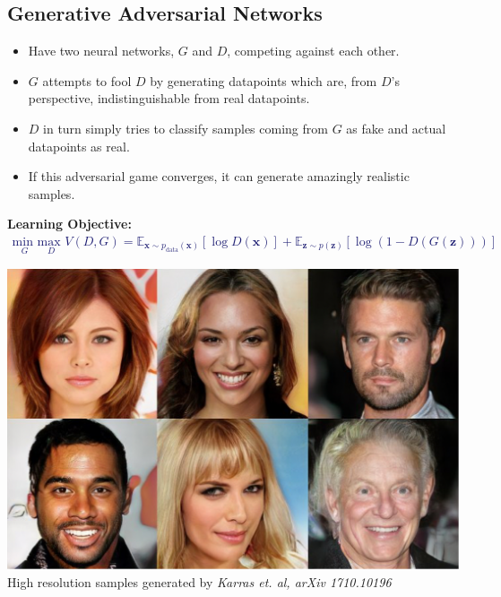 \documentclass[a0,landscape]{a0poster}
\newcommand{\mbf}[1]{{\boldsymbol{\mathbf{#1}}}}
\renewcommand{\bm}{\mbf}
\begin{document}
\begin{multicols}{3} %





\Large

\section*{\fontsize{67.1}{82} \selectfont \color{NavyBlue} Generative Adversarial Networks \color{Black}}
\setlength{}  
\setlength\leftmargini{\dimexpr\leftmargini + 0.5em\relax}
\vspace{-.5in}
\begin{itemize}
\item Have two neural networks, $G$ and $D$, competing against each other. 
\item $G$ attempts to fool $D$ by generating datapoints which are, from $D$'s perspective, indistinguishable from real datapoints.
\item $D$ in turn simply tries to classify samples coming from $G$ as fake and actual datapoints as real.
\item If this adversarial game converges, it can generate amazingly realistic samples.
\end{itemize}
\textbf{Learning Objective:}
\textcolor{MidnightBlue}{
  \begin{align}
    \underset{G}{\text{min }}\underset{D} {\text{max }} V(D,G) = \mathbb{E}_{\bm{x} \sim p_{\text{data}}(\bm{x})} [\log D(\bm{x})]
    + \mathbb{E}_{\bm{z} \sim p(\bm{z})} [\log(1-D(G(\bm{z})))] \nonumber
  \end{align}}
\begin{centering}
\includegraphics[width=.1\textwidth]{goodsamples.pdf} \\
\small High resolution samples generated by \emph{Karras et. al, arXiv 1710.10196} \\
\end{centering}
\vspace{-.8in}


\end{multicols}
\end{document}
